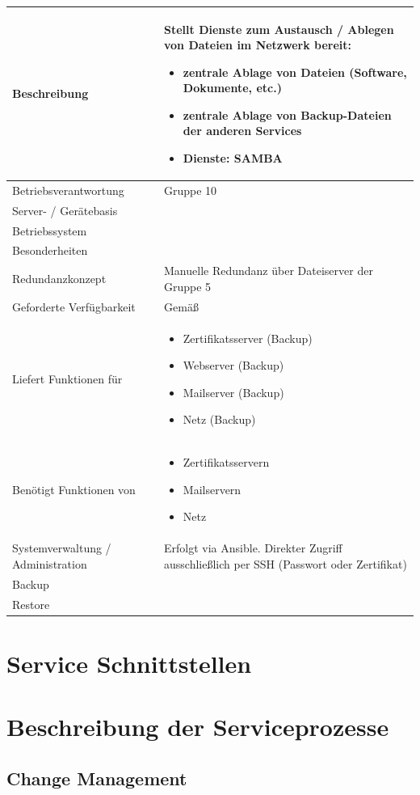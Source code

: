 \documentclass[]{article}
\begin{document}
\begin{longtable}{|l|p{6cm}|}
\toprule
Beschreibung & Stellt Dienste zum Austausch / Ablegen von Dateien im
Netzwerk bereit:

\begin{itemize}
\item
  zentrale Ablage von Dateien (Software, Dokumente, etc.)
\item
  zentrale Ablage von Backup-Dateien der anderen Services
\item
  Dienste: SAMBA
\end{itemize}\tabularnewline
\midrule
Betriebsverantwortung & Gruppe 10\tabularnewline
Server- / Gerätebasis &\tabularnewline
Betriebssystem &\tabularnewline
Besonderheiten &\tabularnewline
Redundanzkonzept & Manuelle Redundanz über Dateiserver der Gruppe
5\tabularnewline
Geforderte Verfügbarkeit & Gemäß\tabularnewline
Liefert Funktionen für & \begin{itemize}
\item
  Zertifikatsserver (Backup)
\item
  Webserver (Backup)
\item
  Mailserver (Backup)
\item
  Netz (Backup)
\end{itemize}\tabularnewline
Benötigt Funktionen von & \begin{itemize}
\item
  Zertifikatsservern
\item
  Mailservern
\item
  Netz
\end{itemize}\tabularnewline
Systemverwaltung / Administration & Erfolgt via Ansible. Direkter Zugriff ausschließlich per SSH (Passwort oder Zertifikat)\tabularnewline
Backup &\tabularnewline
Restore &\tabularnewline
\bottomrule
\end{longtable}

\newpage

\section{Service Schnittstellen}\label{service-schnittstellen}

\section{Beschreibung der
Serviceprozesse}\label{beschreibung-der-serviceprozesse}

\subsection{Change Management}\label{change-management}
\end{document}
